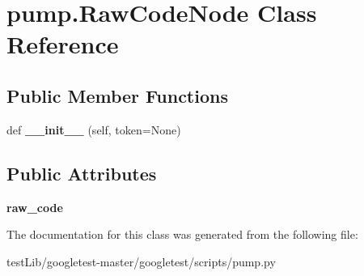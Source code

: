 \hypertarget{classpump_1_1RawCodeNode}{}\section{pump.\+Raw\+Code\+Node Class Reference}
\label{classpump_1_1RawCodeNode}
\subsection*{Public Member Functions}
\begin{DoxyCompactItemize}
\item 
\mbox{\label{classpump_1_1RawCodeNode_a7ba81f4da42d4e96a89713032867f87f}} 
def {\bfseries \+\_\+\+\_\+init\+\_\+\+\_\+} (self, token=None)
\end{DoxyCompactItemize}
\subsection*{Public Attributes}
\begin{DoxyCompactItemize}
\item 
\mbox{\label{classpump_1_1RawCodeNode_ab36224d959e0d8f803e9fac8e6a0baab}} 
{\bfseries raw\+\_\+code}
\end{DoxyCompactItemize}


The documentation for this class was generated from the following file\+:\begin{DoxyCompactItemize}
\item 
test\+Lib/googletest-\/master/googletest/scripts/pump.\+py\end{DoxyCompactItemize}
